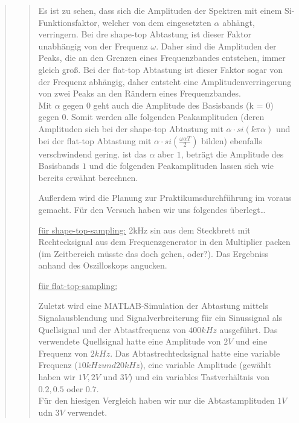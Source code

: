 \begin{quote}
\begin{quote}
		Es ist zu sehen, dass sich die Amplituden der Spektren mit einem
		Si-Funktionsfaktor, welcher von dem eingesetzten $\alpha$ abhängt, verringern.
		Bei dre shape-top Abtastung ist dieser Faktor unabhängig von der Frequenz
		$\omega$. Daher sind die Amplituden der Peaks, die an den Grenzen eines
		Frequenzbandes entstehen, immer gleich groß.    	
		Bei der flat-top Abtastung ist dieser Faktor sogar von der Frequenz abhängig, daher entsteht 
		eine Amplitudenverringerung von zwei Peaks an den Rändern eines
		Frequenzbandes.\\
		Mit $\alpha$ gegen $0$ geht auch die Amplitude des Basisbands (k = $0$) gegen
		$0$. Somit werden alle folgenden Peakamplituden (deren Amplituden sich bei der
		shape-top Abtastung mit $\alpha \cdot si(k \pi \alpha)$ und bei der flat-top
		Abtastung mit $\alpha \cdot si(\frac{\omega \alpha T}{2})$ bilden) ebenfalls
		verschwindend gering. ist das $\alpha$ aber $1$, beträgt die Amplitude des
		Basisbands $1$ und die folgenden Peakamplituden lassen sich wie bereits
		erwähnt berechnen.
    	
    	
    	Außerdem wird die Planung zur Praktikumsdurchführung im voraus gemacht. Für
    	den Versuch haben wir uns folgendes überlegt\ldots
    	
    	\underline{für shape-top-sampling:} 
    	2kHz sin aus dem Steckbrett mit Rechtecksignal aus dem Frequenzgenerator in
    	den Multiplier packen (im Zeitbereich müsste das doch gehen, oder?). Das Ergebniss anhand des
    	Oszilloskops angucken.
    	
    	\underline{für flat-top-sampling:} 
    	
    	
    	
    	Zuletzt wird eine MATLAB-Simulation der Abtastung mittels Signalausblendung
    	und Signalverbreiterung für ein Sinussignal als Quellsignal und der
    	Abtastfrequenz von $400 kHz$ ausgeführt. Das verwendete Quellsignal
    	hatte eine Amplitude von $2V$ und eine Frequenz von $2 kHz$. Das
    	Abtastrechtecksignal hatte eine variable Frequenz ($10 kHz und 20 kHz$),
    	eine variable Amplitude (gewählt haben wir $1V, 2V$ und $3V$) und ein
    	variables Tastverhältnis von $0.2, 0.5$ oder $0.7$.\\
    	Für den hiesigen Vergleich haben wir nur die Abtastamplituden $1V$ udn $3V$
    	verwendet.
    	

\end{quote}
\end{quote}
